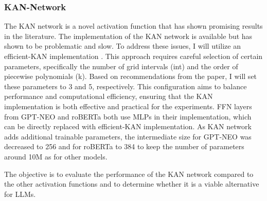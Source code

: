 


\subsubsection{KAN-Network}
The KAN network is a novel activation function that has shown promising results in the literature. The implementation of the KAN network is available but has shown to be problematic and slow. To address these issues, I will utilize an efficient-KAN implementation \cite{efficient-kan}. This approach requires careful selection of certain parameters, specifically the number of grid intervals (int) and the order of piecewise polynomials (k). Based on recommendations from the paper, I will set these parameters to 3 and 5, respectively. This configuration aims to balance performance and computational efficiency, ensuring that the KAN implementation is both effective and practical for the experiments. FFN layers from GPT-NEO and roBERTa both use MLPs in their implementation, which can be directly replaced with efficient-KAN implementation. As KAN network adds additional trainable parameters, the intermediate size for GPT-NEO was decreased to 256 and for roBERTa to 384 to keep the number of parameters around 10M as for other models. 


The objective is to evaluate the performance of the KAN network compared to the other activation functions and to determine whether it is a viable alternative for LLMs.
